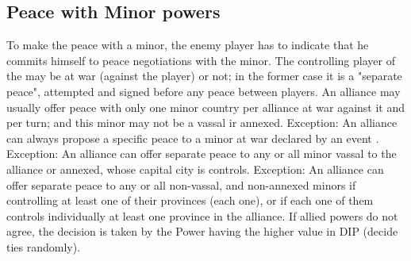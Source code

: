 \subsection{Peace with Minor powers}

\aparag To make the peace with a minor, the enemy player has to indicate that
he commits himself to peace negotiations with the minor.  The controlling
player of the \MIN may be at war (against the player) or not; in the former
case it is a "separate peace", attempted and signed before any peace between
players.
\bparag An alliance may usually offer peace with only one minor country per
alliance at war against it and per turn; and this minor may not be a vassal ir
annexed.
\bparag Exception: An alliance can always propose a specific peace to a minor
at war declared by an event .
\bparag Exception: An alliance can offer separate peace to any or all minor
vassal to the alliance or annexed, whose capital city is controls.
\bparag Exception: An alliance can offer separate peace to any or all
non-vassal, and non-annexed minors if controlling at least one of their
provinces (each one), or if each one of them controls individually at least
one province in the alliance.
\bparag If allied powers do not agree, the decision is taken by the Power
having the higher value in DIP (decide ties randomly).

